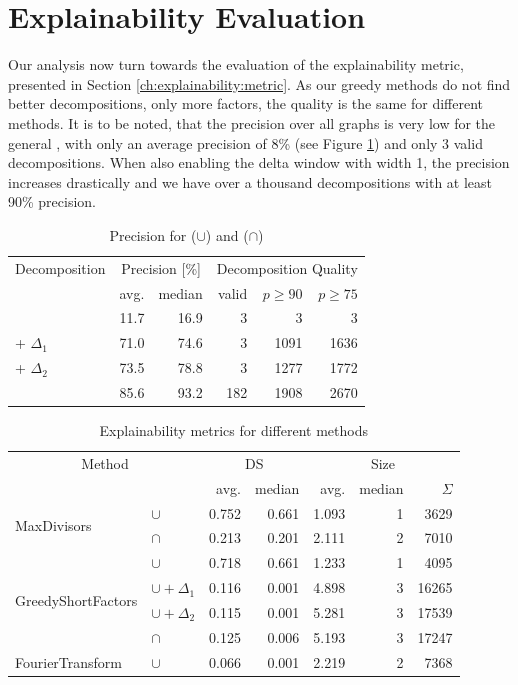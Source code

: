 \section{Explainability Evaluation}
\label{ch:Evaluation:explainability}
Our analysis now turn towards the evaluation of the explainability metric, presented in Section \ref{ch:explainability:metric}.
As our greedy methods do not find better decompositions, only more factors, the quality is the same for different methods.
It is to be noted, that the precision over all graphs is very low for the general \orDecomp, with only an average precision of 8\% (see Figure \ref{tab:eval-precision}) and only 3 valid decompositions.
When also enabling the delta window with width 1, the precision increases drastically and we have over a thousand decompositions with at least 90\% precision. 
\begin{table}[h]
	\centering
	\begin{tabular}{l|rr|rrr}
		\multicolumn{1}{c}{Decomposition} & \multicolumn{2}{c}{Precision [\%]} & \multicolumn{3}{c}{Decomposition Quality} \\
		& avg. & median & valid & $p \geq 90$ & $p \geq 75$ \\
		\hline
		\orDecomp & 11.7 & 16.9 & 3 & 3 & 3 \\
		\orDecomp + $\Delta_1$ & 71.0 & 74.6 & 3 & 1091 & 1636 \\
		\orDecomp + $\Delta_2$ & 73.5 & 78.8 & 3 & 1277 & 1772 \\
		\andDecomp & 85.6 & 93.2 &  182 & 1908 & 2670\\
	\end{tabular}
	\caption{Precision for \orDecomp ($\cup$) and \andDecomp ($\cap$)}
	\label{tab:eval-precision}
\end{table}
\begin{table}[b]
	\centering
	\begin{tabular}{ll|rr|rrr}
		\multicolumn{2}{c}{Method} &  \multicolumn{2}{c}{DS} & \multicolumn{3}{c}{Size}  \\
		& & avg. & median & avg. & median & $\Sigma$ \\
		\hline
		\multirow{2}{*}{MaxDivisors} 
		& $\cup$ & 0.752 & 0.661 &  1.093 & 1 & 3629 \\
		& $\cap$ & 0.213 & 0.201  & 2.111 & 2 & 7010 \\
		\hline
		\multirow{4}{*}{GreedyShortFactors}
		& $\cup$ & 0.718 & 0.661  & 1.233 & 1 & 4095\\
		& $\cup + \Delta_1$ & 0.116 & 0.001   & 4.898 & 3& 16265\\
		& $\cup + \Delta_2$ & 0.115 & 0.001   & 5.281 & 3& 17539\\
		& $\cap$  & 0.125 & 0.006 & 5.193 & 3  & 17247\\
		\hline
		FourierTransform & $\cup$ & 0.066 & 0.001 & 2.219 & 2  & 7368\\
	\end{tabular}
	\caption{Explainability metrics for different methods}
	\label{tab:eval-metric}
\end{table}
